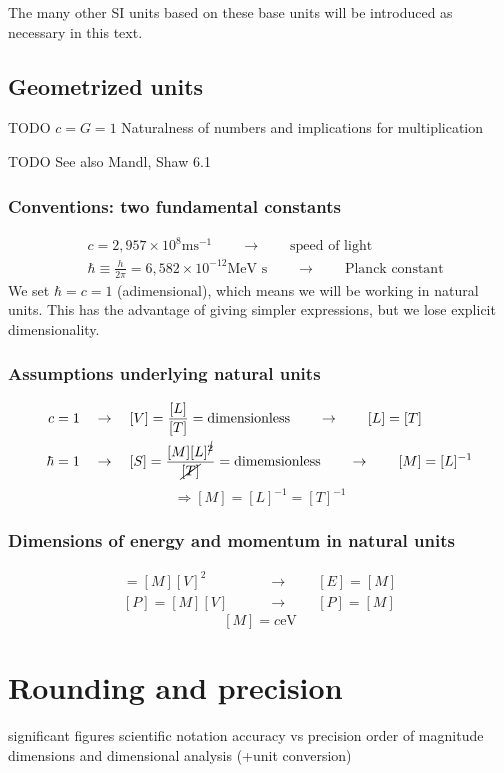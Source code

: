 \documentclass{report}
\begin{document}
The many other SI units based on these base units will be introduced as necessary in this text.

\section{Geometrized units}
TODO $c = G =1$
Naturalness of numbers and implications for multiplication

TODO See also Mandl, Shaw 6.1

\subsection{Conventions: two fundamental constants}
\begin{align*}
&c = 2,957\times 10^8\text{ms}^{-1} \qquad \to \qquad \text{speed of light}\\
&\hbar \equiv \frac{h}{2\pi} = 6,582\times 10^{-12}\text{MeV s} \qquad \to \qquad \text{Planck constant}
\end{align*}
We set $\hbar = c= 1$ (adimensional), which means we will be working in natural units. This has the advantage of giving simpler expressions, but we lose explicit dimensionality.
\subsection{Assumptions underlying natural units}
\begin{align*}
c =1 \quad &\to \quad [V] =\frac{[L]}{[T]} = \text{dimensionless} \qquad \to \qquad [L] = [T] \\
\hbar = 1 \quad &\to \quad [S] = \frac{[M][L]^{\cancel{2}}}{\cancel{[T]}} = \text{dimemsionless} \qquad \to \qquad [M] = [L]^{-1}
\end{align*}
\[ \Rightarrow [M] = [L]^{-1} = [T]^{-1} \]
\subsection{Dimensions of energy and momentum in natural units}
\begin{align*}
[E] = [M][V]^2 \qquad &\to \qquad [E]=[M] \\
[P] = [M][V] \qquad &\to \qquad [P]=[M]
\end{align*} \[ [M] = c\text{eV} \]


\chapter{Rounding and precision}
significant figures
scientific notation
accuracy vs precision
order of magnitude
dimensions and dimensional analysis (+unit conversion)
\end{document}
